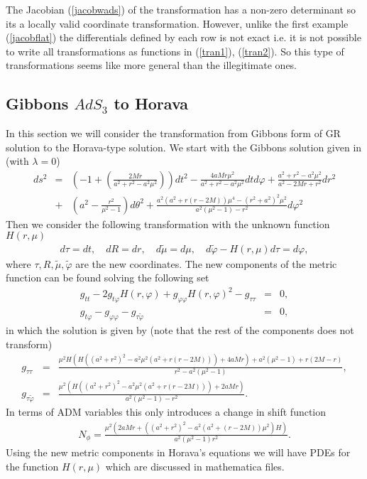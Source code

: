 \documentclass[preprint,aps,tightenlines,showkeys,nofootinbib,superscriptaddress,amsmath]{revtex4}
\begin{document}
The Jacobian (\ref{jacobwads}) of the transformation has a non-zero
determinant so its a locally valid coordinate transformation. However,
unlike the first example (\ref{jacobflat}) the differentials defined
by each row is not exact i.e. it is not possible to write all transformations as
functions in (\ref{tran1}), (\ref{tran2}). So this type of
transformations seems like more general than the illegitimate ones.

\subsection{Gibbons $AdS_3$ to Horava}
In this section we will consider the transformation from Gibbons form
of GR solution to the Horava-type solution. We start with the Gibbons
solution given in \cite{Gibb:2004} (with $\lambda = 0$)
\begin{eqnarray}
  ds^{2} &= & \left(  -1+\left(\frac{2Mr}{a^{2}+r^{2}-a^{2}\mu ^{2}
  }\right)\right)dt^2
  -\frac{4aMr \mu^{2}}{a^{2}+r^{2}-a^2 \mu^2   }dt d
  \varphi+\frac{a^{2}+r^{2}-a^{2}\mu ^{2}    }{a^{2}-2Mr+r^{2}  }dr^2
  \nonumber\\
  & +& \left(a^{2} - \frac{r^{2}}{\mu ^{2}-1 } \right)d \theta ^{2}
  +\frac{a^2(a^2+r(r-2M))\mu ^{4}-(r^2+a^2)^2 \mu ^2}{a^2(\mu
  ^2-1)-r^2 }d \varphi ^2
\end{eqnarray}
Then we consider the following transformation with the unknown
function $H(r,\mu )$
\begin{eqnarray}
  d \tau  = dt,\quad dR=dr,\quad d \tilde \mu  = d \mu, \quad d
  \tilde \varphi -H(r,\mu )d \tau = d \varphi,
\end{eqnarray}
where $\tau ,R,\tilde \mu , \tilde \varphi $ are the new coordinates.
The new components of the metric
function can be found solving the following set
\begin{eqnarray}
  g_{t t}-2g_{t \varphi }H(r,\varphi )+g_{\varphi \varphi
  }H(r,\varphi )^{2}-g_{\tau \tau }&=&0,\\
  g_{t \varphi }-g_{\varphi  \varphi }-g_{\tau \tilde \varphi }&=&0,
\end{eqnarray}
in which the solution is given by (note that the rest of the
components does not transform)
\begin{eqnarray}
  g_{\tau \tau} &=& \frac{{\mu }^2 H \left(H
      \left(\left(a^2+r^2\right)^2-a^2 {\mu }^2 \left(a^2+r (r-2
    M)\right)\right)+4 a M r\right)+a^2 \left({\mu }^2-1\right)+r (2
  M-r)}{r^2-a^2 \left({\mu }^2-1\right)},\\
  g_{\tau \tilde\varphi} &=&\frac{\mu ^2 \left(H
      \left(\left(a^2+r^2\right)^2-a^2 \mu ^2 \left(a^2+r (r-2
  M)\right)\right)+2 a M r\right)}{a^2 \left(\mu ^2-1\right)-r^2}.
\end{eqnarray}
In terms of ADM variables this only introduces a change in shift function
\begin{eqnarray}
  N_{\phi} = \frac{\mu ^{2}(2aMr+((a^{2}+r^2 )^{2}-a^{2}(a^{2}+(r-2M)
  )\mu ^{2}   )H) }{a^{2}(\mu^{2}-1 ) r^{2} }.
\end{eqnarray}
Using the new metric components in Horava's equations we will have
PDEs for the function $H(r,\mu )$ which are discussed in mathematica files.
\end{document}
